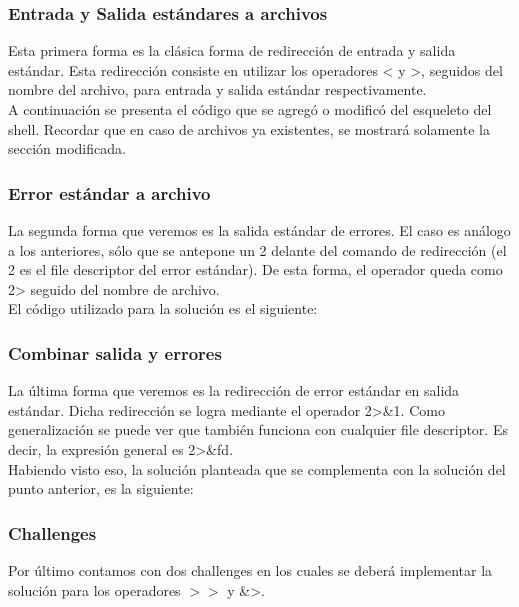 \documentclass[a4paper, 12pt]{article}
\begin{document}
		\subsubsection{Entrada y Salida estándares a archivos}
		Esta primera forma es la clásica forma de redirección de entrada y salida estándar. Esta redirección consiste en utilizar los operadores < y >, seguidos del nombre del archivo, para entrada y salida estándar respectivamente.\\
		
		A continuación se presenta el código que se agregó o modificó del esqueleto del shell. Recordar que en caso de archivos ya existentes, se mostrará solamente la sección modificada.\\
		
		
		\subsubsection{Error estándar a archivo}
		La segunda forma que veremos es la salida estándar de errores. El caso es análogo a los anteriores, sólo que se antepone un 2 delante del comando de redirección (el 2 es el file descriptor del error estándar). De esta forma, el operador queda como 2> seguido del nombre de archivo.\\
		
		El código utilizado para la solución es el siguiente:\\
		
		
		\subsubsection{Combinar salida y errores}
		La última forma que veremos es la redirección de error estándar en salida estándar. Dicha redirección se logra mediante el operador 2>\&1. Como generalización se puede ver que también funciona con cualquier file descriptor. Es decir, la expresión general es 2>\&fd.\\
		
		Habiendo visto eso, la solución planteada que se complementa con la solución del punto anterior, es la siguiente:\\
		
		
		\subsubsection{Challenges}
		Por último contamos con dos challenges en los cuales se deberá implementar la solución para los operadores $>>$ y \&>.\\
		
\end{document}
